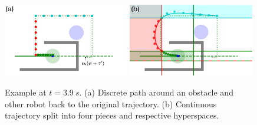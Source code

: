 \documentclass{svproc}
\begin{document}
\begin{figure}
\centering
\includegraphics[width=0.49\textwidth]{images/swap2_discrete.pdf}
\hfill
\includegraphics[width=0.49\textwidth]{images/swap2_cont_red.pdf}
\caption{
Example at $t=\SI{3.9}{s}$.
(a) Discrete path around an obstacle and other robot back to the original trajectory.
(b) Continuous trajectory split into four pieces and respective hyperspaces.
}
\label{fig:swap2_2}
\end{figure}
\end{document}

